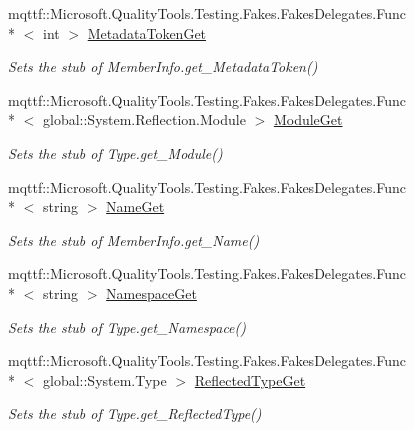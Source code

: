 \begin{DoxyCompactItemize}
mqttf\-::\-Microsoft.\-Quality\-Tools.\-Testing.\-Fakes.\-Fakes\-Delegates.\-Func\\*
$<$ int $>$ \hyperlink{class_system_1_1_fakes_1_1_stub_type_aae8dffa488dc21d1a2435a0f8208b3c7}{Metadata\-Token\-Get}
\begin{DoxyCompactList}\small\item\em Sets the stub of Member\-Info.\-get\-\_\-\-Metadata\-Token()\end{DoxyCompactList}\item 
mqttf\-::\-Microsoft.\-Quality\-Tools.\-Testing.\-Fakes.\-Fakes\-Delegates.\-Func\\*
$<$ global\-::\-System.\-Reflection.\-Module $>$ \hyperlink{class_system_1_1_fakes_1_1_stub_type_aaa400e484087b525912b125116acde44}{Module\-Get}
\begin{DoxyCompactList}\small\item\em Sets the stub of Type.\-get\-\_\-\-Module()\end{DoxyCompactList}\item 
mqttf\-::\-Microsoft.\-Quality\-Tools.\-Testing.\-Fakes.\-Fakes\-Delegates.\-Func\\*
$<$ string $>$ \hyperlink{class_system_1_1_fakes_1_1_stub_type_a78b3c148e89d96c8716d4270aa965a0b}{Name\-Get}
\begin{DoxyCompactList}\small\item\em Sets the stub of Member\-Info.\-get\-\_\-\-Name()\end{DoxyCompactList}\item 
mqttf\-::\-Microsoft.\-Quality\-Tools.\-Testing.\-Fakes.\-Fakes\-Delegates.\-Func\\*
$<$ string $>$ \hyperlink{class_system_1_1_fakes_1_1_stub_type_a0a4456bd90a6c89c8b3c7ec8d9a46ede}{Namespace\-Get}
\begin{DoxyCompactList}\small\item\em Sets the stub of Type.\-get\-\_\-\-Namespace()\end{DoxyCompactList}\item 
mqttf\-::\-Microsoft.\-Quality\-Tools.\-Testing.\-Fakes.\-Fakes\-Delegates.\-Func\\*
$<$ global\-::\-System.\-Type $>$ \hyperlink{class_system_1_1_fakes_1_1_stub_type_a6550b274561c9d564a7e937f7bc187ed}{Reflected\-Type\-Get}
\begin{DoxyCompactList}\small\item\em Sets the stub of Type.\-get\-\_\-\-Reflected\-Type()\end{DoxyCompactList}\item 

\end{DoxyCompactItemize}
